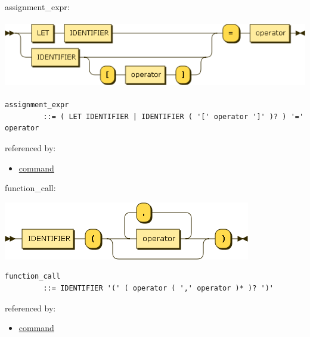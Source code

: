 \begin{minipage}{\textwidth}
\protect\hypertarget{assignment_expr}{}{assignment\_expr:}

\includegraphics[width=5.72917in,height=1.16667in]{diagram/assignment_expr.png}

\begin{verbatim}
assignment_expr
         ::= ( LET IDENTIFIER | IDENTIFIER ( '[' operator ']' )? ) '=' operator
\end{verbatim}

referenced by:

\begin{itemize}
\tightlist
\item
  \protect\hyperlink{command}{command}
\end{itemize}

\end{minipage}

\begin{minipage}{\textwidth}
\protect\hypertarget{function_call}{}{function\_call:}

\includegraphics[width=4.25000in,height=1.00000in]{diagram/function_call.png}

\begin{verbatim}
function_call
         ::= IDENTIFIER '(' ( operator ( ',' operator )* )? ')'
\end{verbatim}

referenced by:

\begin{itemize}
\tightlist
\item
  \protect\hyperlink{command}{command}
\end{itemize}

\end{minipage}

